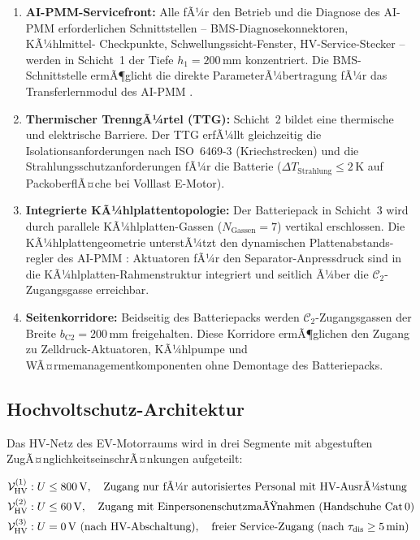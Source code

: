 ﻿\documentclass[12pt,a4paper]{article}
\begin{document}
\begin{enumerate}[leftmargin=*, label=(E\arabic*)]
	\item \textbf{AI-PMM-Servicefront:} Alle fÃ¼r den Betrieb und die Diagnose des
	AI-PMM erforderlichen Schnittstellen -- BMS-Diagnosekonnektoren, KÃ¼hlmittel-
	Checkpunkte, Schwellungssicht-Fenster, HV-Service-Stecker -- werden in
	Schicht~1 der Tiefe $h_1 = 200\,\mathrm{mm}$ konzentriert. Die BMS-Schnittstelle
	ermÃ¶glicht die direkte ParameterÃ¼bertragung fÃ¼r das Transferlernmodul des
	AI-PMM \cite{Epp2026liion}.

	\item \textbf{Thermischer TrenngÃ¼rtel (TTG):} Schicht~2 bildet eine thermische
	und elektrische Barriere. Der TTG erfÃ¼llt gleichzeitig die Isolationsanforderungen
	nach ISO~6469-3 (Kriechstrecken) und die Strahlungsschutzanforderungen fÃ¼r
	die Batterie ($\Delta T_\mathrm{Strahlung} \leq 2\,\mathrm{K}$ auf PackoberflÃ¤che
	bei Volllast E-Motor).

	\item \textbf{Integrierte KÃ¼hlplattentopologie:} Der Batteriepack in Schicht~3
	wird durch parallele KÃ¼hlplatten-Gassen ($N_\mathrm{Gassen} = 7$) vertikal
	erschlossen. Die KÃ¼hlplattengeometrie unterstÃ¼tzt den dynamischen Plattenabstands-
	regler des AI-PMM \cite{Epp2026liion}: Aktuatoren fÃ¼r den Separator-Anpressdruck
	sind in die KÃ¼hlplatten-Rahmenstruktur integriert und seitlich Ã¼ber die
	$\mathcal{C}_2$-Zugangsgasse erreichbar.

	\item \textbf{Seitenkorridore:} Beidseitig des Batteriepacks werden
	$\mathcal{C}_2$-Zugangsgassen der Breite $b_\mathrm{C2} = 200\,\mathrm{mm}$
	freigehalten. Diese Korridore ermÃ¶glichen den Zugang zu Zelldruck-Aktuatoren,
	KÃ¼hlpumpe und WÃ¤rmemanagementkomponenten ohne Demontage des Batteriepacks.
\end{enumerate}

\subsection{Hochvoltschutz-Architektur}

Das HV-Netz des EV-Motorraums wird in drei Segmente mit abgestuften
ZugÃ¤nglichkeitseinschrÃ¤nkungen aufgeteilt:

\begin{align}
	\mathcal{V}_\mathrm{HV}^{(1)} &: U \leq 800\,\mathrm{V}, \quad
	\text{Zugang nur fÃ¼r autorisiertes Personal mit HV-AusrÃ¼stung}
	\label{eq:hv_seg1} \\
	\mathcal{V}_\mathrm{HV}^{(2)} &: U \leq 60\,\mathrm{V}, \quad
	\text{Zugang mit EinpersonenschutzmaÃŸnahmen (Handschuhe Cat\,0)}
	\label{eq:hv_seg2} \\
	\mathcal{V}_\mathrm{HV}^{(3)} &: U = 0\,\mathrm{V} \text{ (nach HV-Abschaltung)}, \quad
	\text{freier Service-Zugang (nach $\tau_\mathrm{dis} \geq 5\,\mathrm{min}$)}
	\label{eq:hv_seg3}
\end{align}
\end{document}
